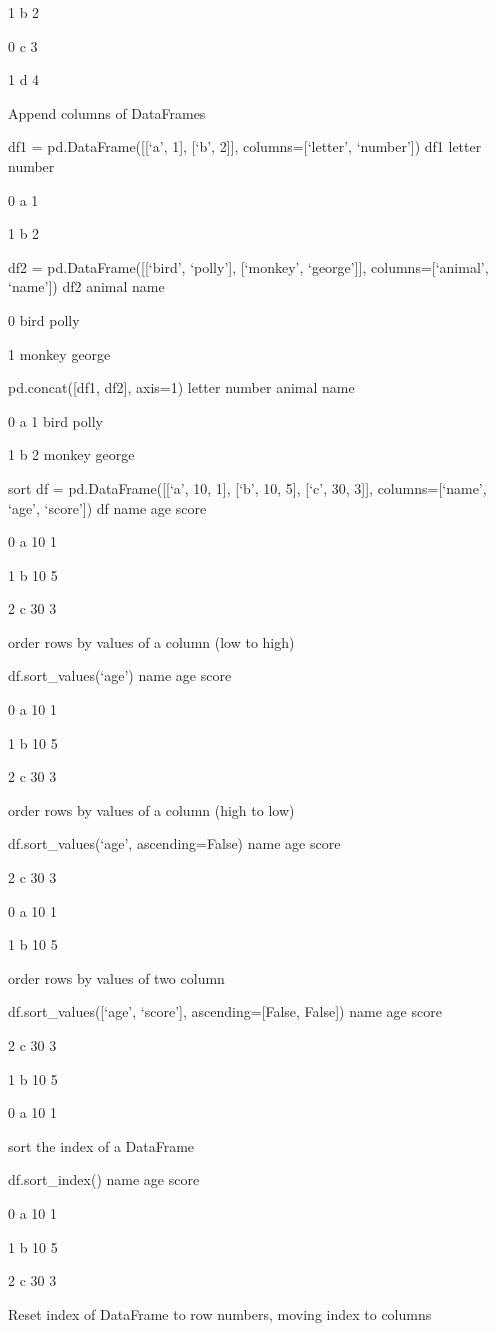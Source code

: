 1 b 2

0 c 3

1 d 4

Append columns of DataFrames

df1 = pd.DataFrame([[‘a’, 1], [‘b’, 2]],
columns=[‘letter’, ‘number’])
df1
letter number

0 a 1

1 b 2

df2 = pd.DataFrame([[‘bird’, ‘polly’], [‘monkey’, ‘george’]],
columns=[‘animal’, ‘name’])
df2
animal name

0 bird polly

1 monkey george

pd.concat([df1, df2], axis=1)
letter number animal name

0 a 1 bird polly

1 b 2 monkey george

sort
df = pd.DataFrame([[‘a’, 10, 1], [‘b’, 10, 5], [‘c’, 30, 3]],
columns=[‘name’, ‘age’, ‘score’])
df
name age score

0 a 10 1

1 b 10 5

2 c 30 3

order rows by values of a column (low to high)

df.sort_values(‘age’)
name age score

0 a 10 1

1 b 10 5

2 c 30 3

order rows by values of a column (high to low)

df.sort_values(‘age’, ascending=False)
name age score

2 c 30 3

0 a 10 1

1 b 10 5

order rows by values of two column

df.sort_values([‘age’, ‘score’], ascending=[False, False])
name age score

2 c 30 3

1 b 10 5

0 a 10 1

sort the index of a DataFrame

df.sort_index()
name age score

0 a 10 1

1 b 10 5

2 c 30 3

Reset index of DataFrame to row numbers, moving index to columns

